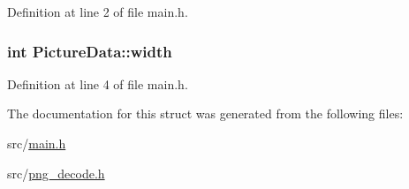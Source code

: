 Definition at line 2 of file main.\-h.

\hypertarget{structPictureData_a5bebf22e70c9d447b40a3bcf83906faa}{
\subsubsection[{width}]{\setlength{\rightskip}{0pt plus 5cm}int Picture\-Data\-::width}}\label{structPictureData_a5bebf22e70c9d447b40a3bcf83906faa}


Definition at line 4 of file main.\-h.



The documentation for this struct was generated from the following files\-:\begin{DoxyCompactItemize}
\item 
src/\hyperlink{main_8h}{main.\-h}\item 
src/\hyperlink{png__decode_8h}{png\-\_\-decode.\-h}\end{DoxyCompactItemize}
